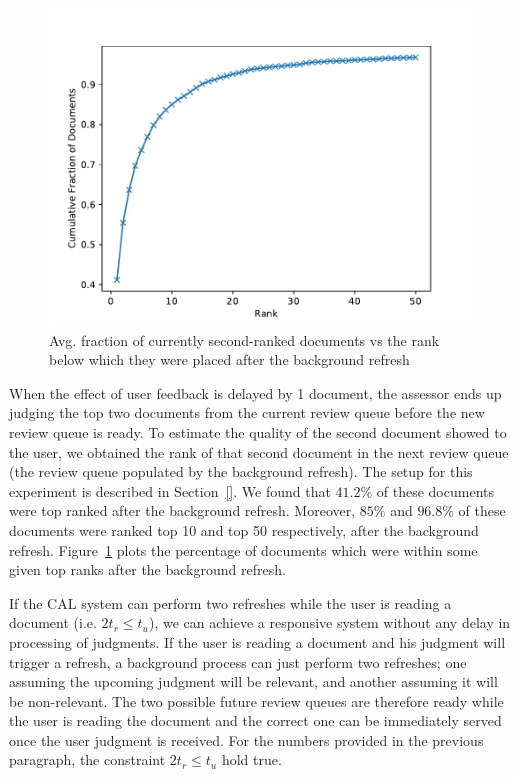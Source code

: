 \begin{figure}[h]
\includegraphics[width=\textwidth]{plots/top_doc_avg_rank.pdf}
\caption{Avg. fraction of currently second-ranked documents vs the rank below
which they were placed after the background refresh}
\label{plot:async}
\end{figure}

When the effect of user feedback is delayed by 1 document, the assessor ends up
judging the top two documents from the current review queue before the new
review queue is ready. To estimate the quality of the second
document showed to the user, we obtained the rank of that second document
in the next review queue (the review queue populated by the background refresh).
The setup for this experiment is described in Section~\ref{}. We found that
$41.2\%$ of these documents were top ranked after the background refresh.
Moreover, $85\%$ and $96.8\%$ of these documents were ranked top 10 and top 50
respectively, after the background refresh. Figure~\ref{plot:async} plots the
percentage of documents which were within some given top ranks after the
background refresh.



If the CAL system can perform two refreshes while the user is reading a
document (i.e. $2t_r \le t_u$), we can achieve a responsive system without any
delay in processing of judgments. If the user is reading a document and his
judgment will trigger a refresh, a background process can just perform two refreshes;
one assuming the upcoming judgment will be relevant, and another assuming it
will be non-relevant.  The two possible future review queues are therefore ready
while the user is reading the document and the correct one can be immediately
served once the user judgment is received. For the numbers provided in the
previous paragraph, the constraint $2t_r \le t_u$ hold true.

